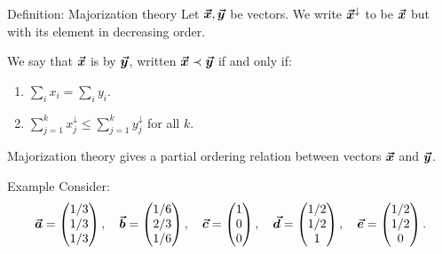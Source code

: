 \documentclass[a4paper]{article}
\begin{document}
\begin{parag}{Definition: Majorization theory}
    Let $\bm{\protect\vec{x}}, \bm{\protect\vec{y}}$ be vectors. We write $\bm{\protect\vec{x}}^{\downarrow}$ to be $\bm{\protect\vec{x}}$ but with its element in decreasing order.

    We say that $\bm{\protect\vec{x}}$ is  by $\bm{\protect\vec{y}}$, written $\bm{\protect\vec{x}} \prec \bm{\protect\vec{y}}$ if and only if:
    \begin{enumerate}
        \item $\sum_{i} x_i = \sum_{i} y_i$.
        \item $\sum_{j=1}^{k} x_j^{\downarrow} \leq \sum_{j=1}^{k} y_j^{\downarrow}$ for all $k$.
    \end{enumerate}

    Majorization theory gives a partial ordering relation between vectors $\bm{\protect\vec{x}}$ and $\bm{\protect\vec{y}}$.

    \begin{subparag}{Example}
        Consider: 
        \[\bm{\protect\vec{a}} = \begin{pmatrix} 1/3 \\ 1/3 \\ 1/3 \end{pmatrix}, \quad \bm{\protect\vec{b}} = \begin{pmatrix} 1/6 \\ 2/3 \\ 1/6 \end{pmatrix}, \quad \bm{\protect\vec{c}} = \begin{pmatrix} 1 \\ 0 \\ 0 \end{pmatrix}, \quad \bm{\protect\vec{d}} = \begin{pmatrix} 1/2 \\ 1/2 \\ 1 \end{pmatrix}, \quad \bm{\protect\vec{e}} = \begin{pmatrix} 1/2 \\ 1/2 \\ 0 \end{pmatrix}.\]


\end{subparag}
\end{parag}
\end{document}
